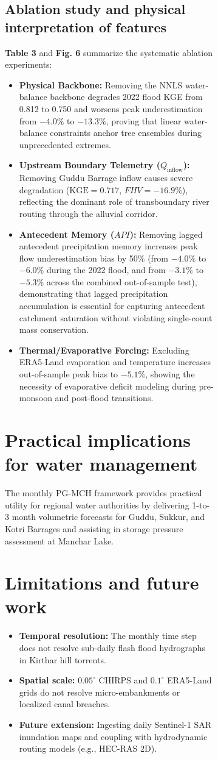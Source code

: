\documentclass[11pt,a4paper,fleqn]{article}
\begin{document}
\begin{figure}[htbp]
\begin{figure}[htbp]
\subsection{Ablation study and physical interpretation of features}
\textbf{Table 3} and \textbf{Fig. 6} summarize the systematic ablation experiments:
\begin{itemize}
    \item \textbf{Physical Backbone:} Removing the NNLS water-balance backbone degrades 2022 flood KGE from 0.812 to 0.750 and worsens peak underestimation from $-4.0\%$ to $-13.3\%$, proving that linear water-balance constraints anchor tree ensembles during unprecedented extremes.
    \item \textbf{Upstream Boundary Telemetry ($Q_{\text{inflow}}$):} Removing Guddu Barrage inflow causes severe degradation ($\text{KGE} = 0.717$, $FHV = -16.9\%$), reflecting the dominant role of transboundary river routing through the alluvial corridor.
    \item \textbf{Antecedent Memory ($API$):} Removing lagged antecedent precipitation memory increases peak flow underestimation bias by 50\% (from $-4.0\%$ to $-6.0\%$ during the 2022 flood, and from $-3.1\%$ to $-5.3\%$ across the combined out-of-sample test), demonstrating that lagged precipitation accumulation is essential for capturing antecedent catchment saturation without violating single-count mass conservation.
    \item \textbf{Thermal/Evaporative Forcing:} Excluding ERA5-Land evaporation and temperature increases out-of-sample peak bias to $-5.1\%$, showing the necessity of evaporative deficit modeling during pre-monsoon and post-flood transitions.
\end{itemize}

\section{Practical implications for water management}
The monthly PG-MCH framework provides practical utility for regional water authorities by delivering 1-to-3 month volumetric forecasts for Guddu, Sukkur, and Kotri Barrages and assisting in storage pressure assessment at Manchar Lake.

\section{Limitations and future work}
\begin{itemize}
    \item \textbf{Temporal resolution:} The monthly time step does not resolve sub-daily flash flood hydrographs in Kirthar hill torrents.
    \item \textbf{Spatial scale:} $0.05^\circ$ CHIRPS and $0.1^\circ$ ERA5-Land grids do not resolve micro-embankments or localized canal breaches.
    \item \textbf{Future extension:} Ingesting daily Sentinel-1 SAR inundation maps \citep{tian2023satellite} and coupling with hydrodynamic routing models (e.g., HEC-RAS 2D).
\end{itemize}


\end{figure}
\end{figure}
\end{document}
